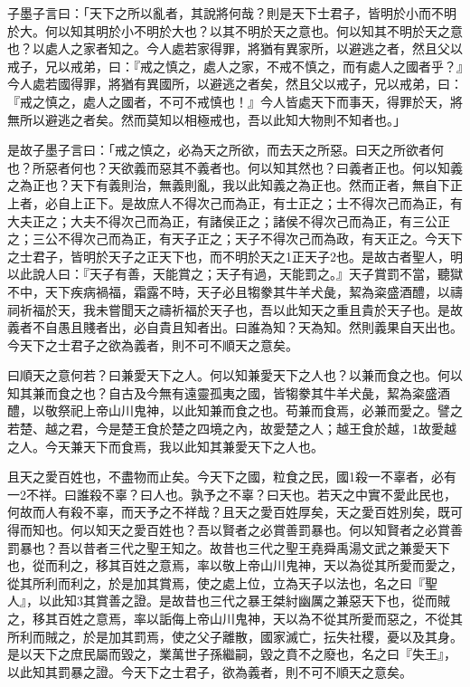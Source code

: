 
\begin{pinyinscope}
子墨子言曰：「天下之所以亂者，其說將何哉？則是天下士君子，皆明於小而不明於大。何以知其明於小不明於大也？以其不明於天之意也。何以知其不明於天之意也？以處人之家者知之。今人處若家得罪，將猶有異家所，以避逃之者，然且父以戒子，兄以戒弟，曰：『戒之慎之，處人之家，不戒不慎之，而有處人之國者乎？』今人處若國得罪，將猶有異國所，以避逃之者矣，然且父以戒子，兄以戒弟，曰：『戒之慎之，處人之國者，不可不戒慎也！』今人皆處天下而事天，得罪於天，將無所以避逃之者矣。然而莫知以相極戒也，吾以此知大物則不知者也。」

是故子墨子言曰：「戒之慎之，必為天之所欲，而去天之所惡。曰天之所欲者何也？所惡者何也？天欲義而惡其不義者也。何以知其然也？曰義者正也。何以知義之為正也？天下有義則治，無義則亂，我以此知義之為正也。然而正者，無自下正上者，必自上正下。是故庶人不得次己而為正，有士正之；士不得次己而為正，有大夫正之；大夫不得次己而為正，有諸侯正之；諸侯不得次己而為正，有三公正之；三公不得次己而為正，有天子正之；天子不得次己而為政，有天正之。今天下之士君子，皆明於天子之正天下也，而不明於天之1正天子2也。是故古者聖人，明以此說人曰：『天子有善，天能賞之；天子有過，天能罰之。』天子賞罰不當，聽獄不中，天下疾病禍福，霜露不時，天子必且犓豢其牛羊犬彘，絜為粢盛酒醴，以禱祠祈福於天，我未嘗聞天之禱祈福於天子也，吾以此知天之重且貴於天子也。是故義者不自愚且賤者出，必自貴且知者出。曰誰為知？天為知。然則義果自天出也。今天下之士君子之欲為義者，則不可不順天之意矣。

曰順天之意何若？曰兼愛天下之人。何以知兼愛天下之人也？以兼而食之也。何以知其兼而食之也？自古及今無有遠靈孤夷之國，皆犓豢其牛羊犬彘，絜為粢盛酒醴，以敬祭祀上帝山川鬼神，以此知兼而食之也。苟兼而食焉，必兼而愛之。譬之若楚、越之君，今是楚王食於楚之四境之內，故愛楚之人；越王食於越，1故愛越之人。今天兼天下而食焉，我以此知其兼愛天下之人也。

且天之愛百姓也，不盡物而止矣。今天下之國，粒食之民，國1殺一不辜者，必有一2不祥。曰誰殺不辜？曰人也。孰予之不辜？曰天也。若天之中實不愛此民也，何故而人有殺不辜，而天予之不祥哉？且天之愛百姓厚矣，天之愛百姓別矣，既可得而知也。何以知天之愛百姓也？吾以賢者之必賞善罰暴也。何以知賢者之必賞善罰暴也？吾以昔者三代之聖王知之。故昔也三代之聖王堯舜禹湯文武之兼愛天下也，從而利之，移其百姓之意焉，率以敬上帝山川鬼神，天以為從其所愛而愛之，從其所利而利之，於是加其賞焉，使之處上位，立為天子以法也，名之曰『聖人』，以此知3其賞善之證。是故昔也三代之暴王桀紂幽厲之兼惡天下也，從而賊之，移其百姓之意焉，率以詬侮上帝山川鬼神，天以為不從其所愛而惡之，不從其所利而賊之，於是加其罰焉，使之父子離散，國家滅亡，抎失社稷，憂以及其身。是以天下之庶民屬而毀之，業萬世子孫繼嗣，毀之賁不之廢也，名之曰『失王』，以此知其罰暴之證。今天下之士君子，欲為義者，則不可不順天之意矣。


\end{pinyinscope}
